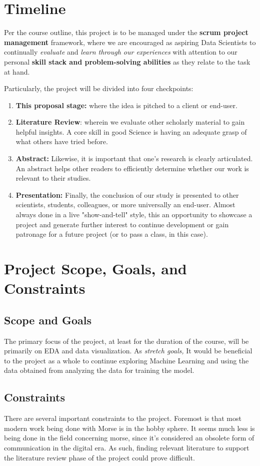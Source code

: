 \documentclass[11pt]{article}
\begin{document}
\section{Timeline}
\label{sec:org0734104}
Per the course outline, this project is to be managed under the \textbf{scrum project management} framework,
where we are encouraged as aspiring Data Scientists to continually \emph{evaluate} and \emph{learn through our experiences}
with attention to our personal \textbf{skill stack and problem-solving abilities} as they relate to the task at hand.

Particularly, the project will be divided into four checkpoints:

\begin{enumerate}
\item \textbf{This proposal stage:} where the idea is pitched to a client or end-user.
\item \textbf{Literature Review}: wherein we evaluate other scholarly material to gain helpful insights.
A core skill in good Science is having an adequate grasp of what others have tried before.
\item \textbf{Abstract:} Likewise, it is important that one's research is clearly articulated. An abstract helps
other readers to efficiently determine whether our work is relevant to their studies.
\item \textbf{Presentation:} Finally, the conclusion of our study is presented to other scientists, students, colleagues,
or more universally an end-user. Almost always done in a live "show-and-tell" style, this an opportunity to showcase
a project and generate further interest to continue development or gain patronage for a future project (or to pass a class, in this case).
\end{enumerate}
\section{Project Scope, Goals, and Constraints}
\label{sec:org57423fc}
\subsection{Scope and Goals}
\label{sec:org2fc8765}
The primary focus of the project, at least for the duration of the course, will be primarily on EDA and data visualization. As \emph{stretch goals,}
It would be beneficial to the project as a whole to continue exploring Machine Learning and using the data obtained from analyzing the data for
training the model.
\subsection{Constraints}
\label{sec:orgedde2d5}
There are several important constraints to the project. Foremost is that most modern work being done with Morse is in the hobby sphere.
It seems much less is being done in the field concerning morse, since it's considered an obsolete form of communication in the digital era.
As such, finding relevant literature to support the literature review phase of the project could prove difficult.
\end{document}
